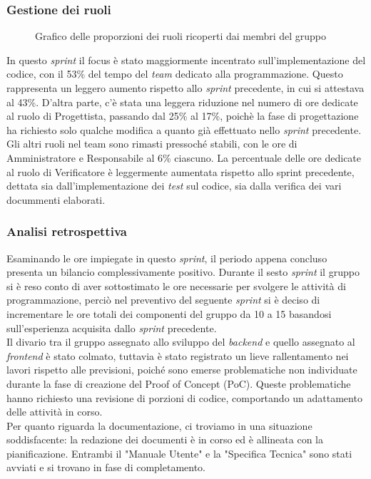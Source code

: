 \subsubsection{Gestione dei ruoli}
\begin{figure}[h]
	\centering
	\caption{Grafico delle proporzioni dei ruoli ricoperti dai membri del gruppo}
\end{figure}

In questo \textit{sprint} il focus è stato maggiormente incentrato sull'implementazione del codice, con il 53\% del tempo del \textit{team} dedicato alla programmazione. Questo rappresenta un leggero aumento rispetto allo \textit{sprint} precedente, in cui si attestava al 43\%.
D'altra parte, c'è stata una leggera riduzione nel numero di ore dedicate al ruolo di Progettista, passando dal 25\% al 17\%, poichè la fase di progettazione ha richiesto solo qualche modifica a quanto già effettuato nello \textit{sprint} precedente.
Gli altri ruoli nel team sono rimasti pressoché stabili, con le ore di Amministratore e Responsabile al 6\% ciascuno. 
La percentuale delle ore dedicate al ruolo di Verificatore è leggermente aumentata rispetto allo sprint precedente, dettata sia dall'implementazione dei \textit{test} sul codice, sia dalla verifica dei vari docummenti elaborati.

\subsubsection{Analisi retrospettiva}
Esaminando le ore impiegate in questo \textit{sprint}, il periodo appena concluso presenta un bilancio complessivamente positivo. Durante il sesto \textit{sprint} il gruppo si è reso conto di aver sottostimato le ore necessarie per svolgere le attività di programmazione, perciò nel preventivo del seguente \textit{sprint} si è deciso di incrementare le ore totali dei componenti del gruppo da 10 a 15 basandosi sull'esperienza acquisita dallo \textit{sprint} precedente.\\
Il divario tra il gruppo assegnato allo sviluppo del \textit{backend} e quello assegnato al \textit{frontend} è stato colmato, tuttavia è stato registrato un lieve rallentamento nei lavori rispetto alle previsioni, poiché sono emerse problematiche non individuate durante la fase di creazione del Proof of Concept (PoC). Queste problematiche hanno richiesto una revisione di porzioni di codice, comportando un adattamento delle attività in corso.\\
Per quanto riguarda la documentazione, ci troviamo in una situazione soddisfacente: la redazione dei documenti è in corso ed è allineata con la pianificazione. Entrambi il "Manuale Utente" e la "Specifica Tecnica" sono stati avviati e si trovano in fase di completamento.

